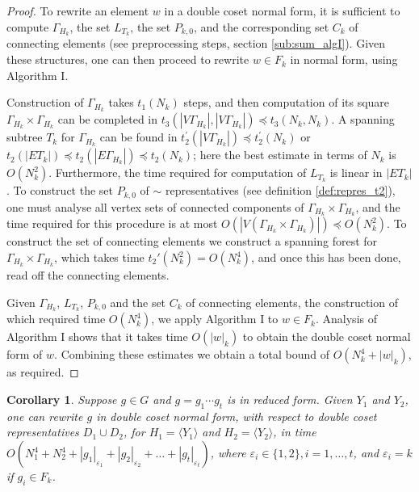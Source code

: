 \documentclass[a4paper,12pt]{article}
\newcommand{\G}{\Gamma }
\newcommand{\e}{\varepsilon }
\newtheorem{corollary}[theorem]{Corollary}
\numberwithin{equation}{section}
\numberwithin{figure}{section}
\newcommand{\la}{\langle}
\newcommand{\ra}{\rangle}
\begin{document}
\begin{proof}
To rewrite an element $w$ in a double coset normal form, it is
sufficient to compute $\G_{H_k}$, the set $L_{T_k}$,
the set $P_{k,0}$, and the
corresponding  set $C_k$ of connecting elements (see preprocessing steps, section \ref{sub:sum_algI}).
 Given these structures, one can then proceed to rewrite $w \in
F_k$ in normal form, using Algorithm I.

Construction of $\G_{H_k}$ takes  $t_1(N_k)$ steps, and then
computation of its square
 $\G_{H_k} \times \G_{H_k}$ can be completed in
 $t_3(|V\G_{H_k}|,|V\G_{H_k}|) \preceq t_3(N_k,N_k)$.
A spanning subtree $T_k$ for $\G_{H_k}$ can be found in
$t^{\prime}_2(|V\G_{H_k}|) \preceq t^{\prime}_2(N_k)$ or $t_2(|E
T_k|) \preceq t_2(|E\G_{H_k}|) \preceq t_2(N_k)$; here the best
estimate in terms of $N_k$ is $O(N_k^2)$. Furthermore, the time
required for computation of $L_{T_k}$ is linear in $|E T_k|$.
To construct the set $P_{k,0}$ of $\sim$
representatives (see definition \ref{def:repres_t2}), one must
analyse all vertex sets of connected components of $\G_{H_k}
\times \G_{H_k}$, and the time  required for this procedure is at
most $O(|V(\G_{H_k} \times \G_{H_k})|) \preceq O(N^2_k)$. To construct
the set of connecting elements we construct a spanning forest for
$\G_{H_k} \times \G_{H_k}$, which takes time $t_2'(N_k^2)
=O(N_k^4)$, and once this
has been done, read off the connecting elements.

Given $\G_{H_k}$, $L_{T_k}$, $P_{k,0}$ and the set $C_k$ of connecting elements,
the construction of which required time
 $O(N^4_k)$,
 we apply Algorithm I to $w \in F_k$. Analysis
of Algorithm I shows that it takes time  $O(|w|_k)$  to obtain
the double coset normal form of $w$. Combining these estimates
 we obtain a total bound of $O(N^4_k + |w|_k)$, as required.
\end{proof}

\begin{corollary}\label{cor:dcnf_time} Suppose $g \in G$ and $g=g_1 \cdots g_t$ is in reduced
form. Given $Y_1$ and $Y_2$, one can rewrite $g$ in double coset normal
form, with respect to double coset representatives $D_1\cup D_2$, for 
$H_1=\la Y_1\ra$ and $H_2=\la Y_2\ra$, in time  $O(N^4_1+ N^4_2 + |g_1|_{\e_1}+|g_2|_{\e_2}+
\ldots +|g_t|_{\e_t})$, where $\e_i \in \{ 1, 2\}, i = 1, \ldots,
t$, and $\e_i = k$ if $g_i \in F_k$.
\end{corollary}
\end{document}
